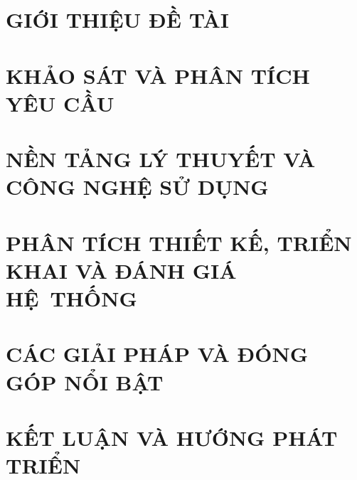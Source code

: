 \documentclass[a4paper,13pt,twoside]{report}
\theoremstyle{definition}
\begin{document}
\clearpage


\clearpage
{}

\pagestyle{fancy}
\fancyhf{}
\fancyhead[RE, LO]{\small\leftmark}
\fancyfoot[RE, LO]{\thepage}

\chapter{GIỚI THIỆU ĐỀ TÀI}
\label{chapter:Introduction}

\newpage
\chapter{KHẢO SÁT VÀ PHÂN TÍCH YÊU CẦU}
\label{chapter:Related_works}



\newpage
\chapter{NỀN TẢNG LÝ THUYẾT VÀ CÔNG NGHỆ SỬ DỤNG}
\label{chapter:Methodology}


\newpage
\chapter{PHÂN TÍCH THIẾT KẾ, TRIỂN KHAI VÀ ĐÁNH GIÁ HỆ~THỐNG}
\label{chapter:Experiment}


\newpage
\chapter{CÁC GIẢI PHÁP VÀ ĐÓNG GÓP NỔI BẬT}
\label{chapter:SolutionAndContribution}

\newpage
\chapter{KẾT LUẬN VÀ HƯỚNG PHÁT TRIỂN}
\label{chapter:conclusion}

\end{document}
